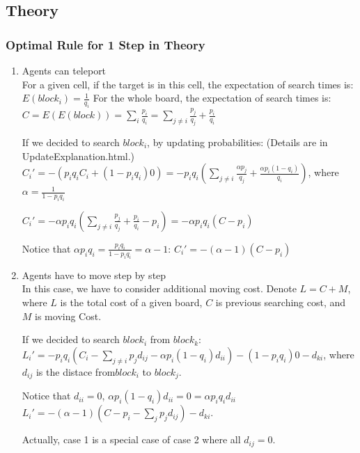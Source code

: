 \documentclass[letter]{article}
\begin{document}
\subsection{Theory}
\label{sec:2-theory}
\subsubsection{Optimal Rule for 1 Step in Theory}
\begin{enumerate}
	\item {Agents can teleport} \\
	For a given cell, if the target is in this cell, the expectation of search times is:
	$E(block_i) = \frac{1}{q_i}$
	For the whole board, the expectation of search times is:
	$C = E(E(block)) = \sum\limits_i\frac{p_i}{q_i} = \sum\limits_{j \ne i}\frac{p_j}{q_j} + \frac{p_i}{q_i}$
	
	If we decided to search $block_i$, by updating probabilities: (Details are in UpdateExplanation.html.)
	$C_i' = -(p_iq_iC_i+ (1-p_iq_i)0) = -p_iq_i(\sum\limits_{j \ne i}\frac{\alpha p_j}{q_j} + \frac{\alpha p_i(1-q_i)}{q_i})$, where $\alpha = \frac{1}{1-p_iq_i}$
	
	$C_i' = -\alpha p_iq_i(\sum\limits_{j \ne i}\frac{p_j}{q_j} + \frac{p_i}{q_i} - p_i) = -\alpha p_iq_i(C-p_i)$
	
	Notice that $\alpha p_iq_i = \frac{p_iq_i}{1-p_iq_i} =\alpha-1$:
	$C_i' = -(\alpha - 1)(C-p_i)$
	\item {Agents have to move step by step} \\
	In this case, we have to consider additional moving cost.
	Denote $L = C + M$, where $L$ is the total cost of a given board, $C$ is previous searching cost, and $M$ is moving Cost.
	
	If we decided to search $block_i$ from $block_k$:
	$L_i' = -p_iq_i(C_i - \sum\limits_{j \ne i}p_jd_{ij} -\alpha p_i(1-q_i)d_{ii}) - (1-p_iq_i)0 - d_{ki}$, where $d_{ij}$ is the distace from$block_i$ to $block_j$.
	
	Notice that $d_{ii} = 0$, $\alpha p_i(1-q_i)d_{ii} = 0 = \alpha p_iq_id_{ii}$
	$L_i' = -(\alpha - 1)(C - p_i - \sum\limits_j p_jd_{ij}) - d_{ki}$.
	
	Actually, case 1 is a special case of case 2 where all $d_{ij} = 0$.
\end{enumerate}
\end{document}

